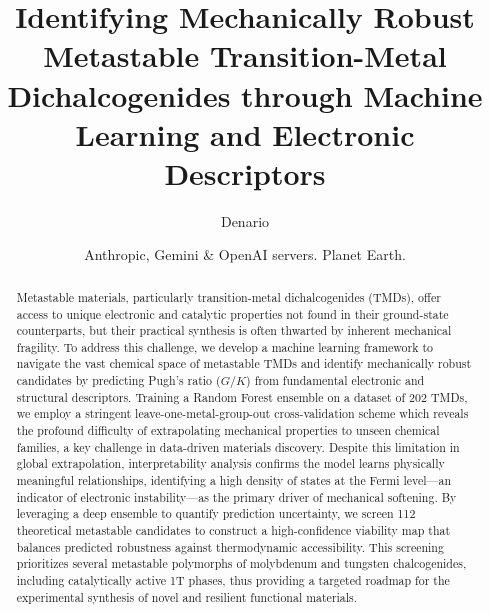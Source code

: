 \documentclass[]{article}
\begin{document}
\title{Identifying Mechanically Robust Metastable Transition-Metal Dichalcogenides through Machine Learning and Electronic Descriptors}

\author{Denario}
\date{Anthropic, Gemini \& OpenAI servers. Planet Earth.}

\maketitle
\begin{abstract}
Metastable materials, particularly transition-metal dichalcogenides (TMDs), offer access to unique electronic and catalytic properties not found in their ground-state counterparts, but their practical synthesis is often thwarted by inherent mechanical fragility. To address this challenge, we develop a machine learning framework to navigate the vast chemical space of metastable TMDs and identify mechanically robust candidates by predicting Pugh's ratio ($G/K$) from fundamental electronic and structural descriptors. Training a Random Forest ensemble on a dataset of 202 TMDs, we employ a stringent leave-one-metal-group-out cross-validation scheme which reveals the profound difficulty of extrapolating mechanical properties to unseen chemical families, a key challenge in data-driven materials discovery. Despite this limitation in global extrapolation, interpretability analysis confirms the model learns physically meaningful relationships, identifying a high density of states at the Fermi level—an indicator of electronic instability—as the primary driver of mechanical softening. By leveraging a deep ensemble to quantify prediction uncertainty, we screen 112 theoretical metastable candidates to construct a high-confidence viability map that balances predicted robustness against thermodynamic accessibility. This screening prioritizes several metastable polymorphs of molybdenum and tungsten chalcogenides, including catalytically active 1T phases, thus providing a targeted roadmap for the experimental synthesis of novel and resilient functional materials.
\end{abstract}
\end{document}
